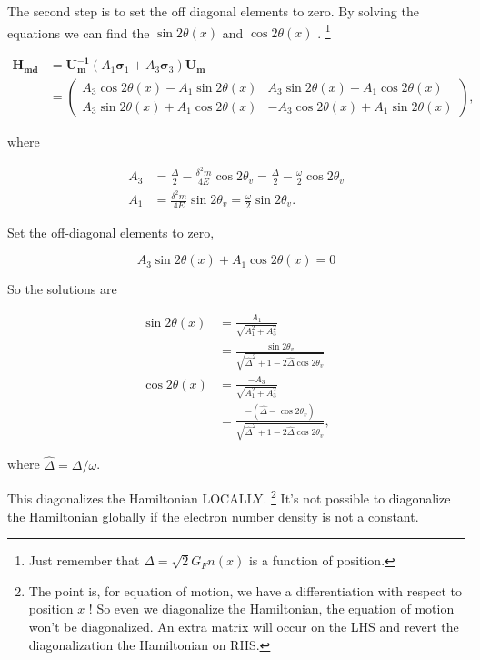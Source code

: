 \documentclass{tufte-handout}
\begin{document}
The second step is to set the off diagonal elements to zero. By solving the equations we can find the  $\sin 2\theta(x)$ and  $\cos 2\theta(x)$ . \footnote{Just remember that $\Delta = \sqrt{2}G_F n(x)$ is a function of position.}

\begin{align*}
\mathbf{H_{md}} &= \mathbf{U^{-1}_m} \left( A_1 \boldsymbol{ \sigma}_1  + A_3 \boldsymbol{\sigma}_3 \right) \mathbf{ U_m } \\
& = \begin{pmatrix} A_3\cos 2\theta(x) - A_1 \sin 2\theta(x) & A_3 \sin 2\theta(x) + A_1 \cos 2\theta(x) \\ A_3 \sin 2\theta(x) + A_1\cos 2\theta(x) &  - A_3 \cos 2\theta(x) + A_1 \sin 2\theta(x) \end{pmatrix},
\end{align*}

where

\begin{align*}
A_3 &  = \frac{\Delta}{2} - \frac{\delta^2 m}{4E}\cos 2\theta_v = \frac{\Delta}{2} - \frac{\omega}{2} \cos 2\theta_v \\
A_1 & =  \frac{\delta^2 m}{4E} \sin 2\theta_v = \frac{\omega}{2}\sin 2\theta_v.
\end{align*}

Set the off-diagonal elements to zero,

\begin{equation*}
A_3 \sin 2\theta(x) + A_1 \cos 2\theta(x)  = 0
\end{equation*}

So the solutions are

\begin{align*}
\sin 2\theta(x) & = \frac{A_1}{\sqrt{A_1^2 + A_3^2}}  \\
& = \frac{\sin 2\theta_v}{\sqrt{\hat\Delta^2 + 1 - 2\hat\Delta \cos 2\theta_v}}\\
\cos 2\theta(x) & = \frac{-A_3}{\sqrt{A_1^2+A_3^2}} \\
& = \frac{- (\hat\Delta - \cos 2\theta_v )}{ \sqrt{\hat\Delta^2 + 1 - 2\hat\Delta \cos 2\theta_v} } ,
\end{align*}

where $\hat\Delta = \Delta/\omega$.




This diagonalizes the Hamiltonian LOCALLY. \footnote{The point is, for equation of motion, we have a differentiation with respect to position  $x$ ! So even we diagonalize the Hamiltonian, the equation of motion won't be diagonalized. An extra matrix will occur on the LHS and revert the diagonalization the Hamiltonian on RHS.
} It's not possible to diagonalize the Hamiltonian globally if the electron number density is not a constant.
\end{document}
